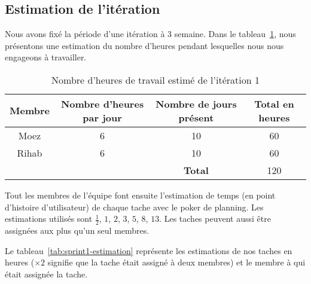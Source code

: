 \subsection{Estimation de l'itération}

Nous avons fixé la période d'une itération à 3 semaine. Dans le
tableau~\ref{tab:sprint1-capacity}, nous présentons une estimation du nombre
d'heures pendant lesquelles nous nous engageons à travailler.

\begin{table}[htbp]
    \centering
    \begin{tabular}{| c | c | c | c |}
        \hline
        \textbf{Membre} & \textbf{Nombre d'heures par jour} & \textbf{Nombre de jours présent} & \textbf{Total en heures} \\ \hline
        \hline

Moez & 6 & 10 & 60\\ \hline
Rihab & 6 & 10 & 60 \\ \hline
\multicolumn{2}{c|}{} & \textbf{Total} & 120 \\ \cline{3-4}
    \end{tabular}
    \caption{Nombre d'heures de travail estimé de l'itération 1}
\label{tab:sprint1-capacity}
\end{table}

Tout les membres de l'équipe font ensuite l'estimation de temps (en point
d'histoire d'utilisateur) de chaque tache avec le poker de planning. Les
estimations utilisés sont $\frac{1}{2}$, $1$, $2$, $3$, $5$, $8$, $13$. Les
taches peuvent aussi être assignées aux plus qu'un seul membres.

Le tableau~\ref{tab:sprint1-estimation} représente les estimations de nos
taches en heures ($\times2$ signifie que la tache était assigné à deux membres)
et le membre à qui était assignée la tache.

